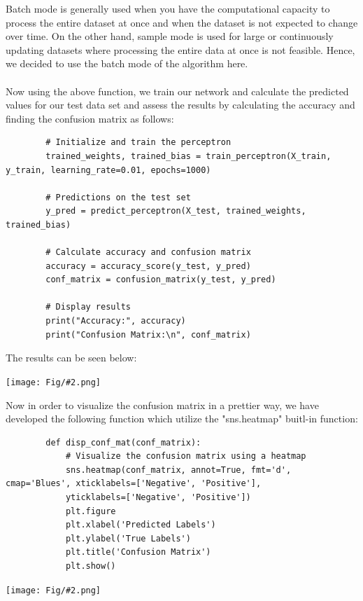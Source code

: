 \documentclass[]{article}
\newcommand{\pict}[2]{\begin{center}
		\texttt{[image: Fig/\#2.png]}
\end{center}}
\begin{document}
	Batch mode is generally used when you have the computational capacity to process the entire dataset at once and when the dataset is not expected to change over time. On the other hand, sample mode is used for large or continuously updating datasets where processing the entire data at once is not feasible. Hence, we decided to use the batch mode of the algorithm here.\\\\
	Now using the above function, we train our network and calculate the predicted values for our test data set and assess the results by  calculating the accuracy and finding the confusion matrix as follows:
	\begin{lstlisting}
		# Initialize and train the perceptron
		trained_weights, trained_bias = train_perceptron(X_train, y_train, learning_rate=0.01, epochs=1000)
		
		# Predictions on the test set
		y_pred = predict_perceptron(X_test, trained_weights, trained_bias)
		
		# Calculate accuracy and confusion matrix
		accuracy = accuracy_score(y_test, y_pred)
		conf_matrix = confusion_matrix(y_test, y_pred)
		
		# Display results
		print("Accuracy:", accuracy)
		print("Confusion Matrix:\n", conf_matrix)
	\end{lstlisting}
	The results can be seen below:
	\pict{0.3}{F2}
	Now in order to visualize the confusion matrix in a prettier way, we have developed the following function which utilize the "sns.heatmap" buitl-in function:
	\begin{lstlisting}
		def disp_conf_mat(conf_matrix):
			# Visualize the confusion matrix using a heatmap
			sns.heatmap(conf_matrix, annot=True, fmt='d', cmap='Blues', xticklabels=['Negative', 'Positive'],
			yticklabels=['Negative', 'Positive'])
			plt.figure
			plt.xlabel('Predicted Labels')
			plt.ylabel('True Labels')
			plt.title('Confusion Matrix')
			plt.show()
	\end{lstlisting}
	\pict{0.4}{F3}
	
\end{document}
